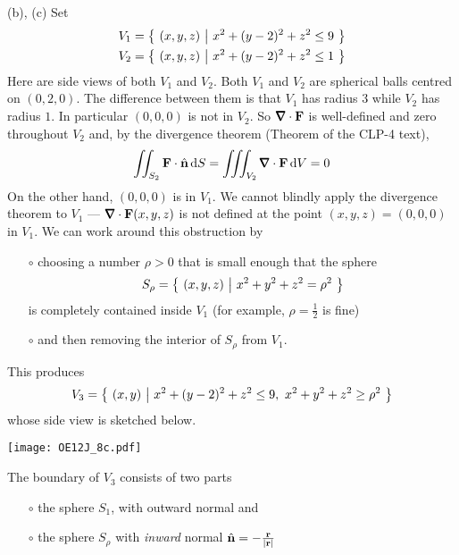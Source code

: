 \begin{solution}
(b), (c) Set
\begin{align*}
V_1 &= \big\{ \ (x,y,z)\ \big|\ x^2 + (y - 2)^2 + z^2 \le 9\ \big\} \\
V_2 &= \big\{ \ (x,y,z)\ \big|\ x^2 + (y - 2)^2 + z^2 \le 1\ \big\} 
\end{align*}
Here are side views of both $V_1$ and $V_2$.
%
Both $V_1$ and $V_2$ are spherical balls centred on $(0,2,0)$.
The difference between them is that $V_1$ has radius $3$ while $V_2$
has radius $1$. In particular $(0,0,0)$ is not in $V_2$. So $\vnabla\cdot\vF$ is 
well-defined and zero throughout $V_2$ and, by the divergence theorem
(Theorem  of the CLP-4 text),
\begin{align*}
\dblInt_{S_2} \vF\cdot\hn\,\dee{S}
=\tripInt_{V_2} \vnabla\cdot\vF\,\dee{V}
=0
\end{align*}
On the other hand, $(0,0,0)$ is in $V_1$. We cannot blindly apply the divergence
theorem to $V_1$ --- $\vnabla\cdot\vF(x,y,z)$ is not defined at the point
$(x,y,z)=(0,0,0)$ in $V_1$. We can work around this obstruction
by 
\begin{itemize}\itemsep1pt \parskip0pt  %
\item[$\circ$]
choosing a number $\rho>0$ that is small enough that the sphere
\begin{equation*}
S_\rho = \big\{ \ (x,y,z)\ \big|\ x^2+y^2+z^2=\rho^2\ \big\}
\end{equation*}
is completely contained inside $V_1$ (for example, $\rho=\frac{1}{2}$ is fine)
\item[$\circ$]
and then removing the interior of $S_\rho$ from $V_1$. 
\end{itemize}
This produces
\begin{equation*}
V_3 = \big\{ \ (x,y)\ \big|\ x^2 + (y - 2)^2 + z^2 \le 9,\ x^2+y^2+z^2\ge\rho^2\ \big\}
\end{equation*}
whose side view is sketched below.
 \begin{center}
    \texttt{[image: OE12J\_8c.pdf]}
\end{center}
The boundary of $V_3$ consists of two parts
\begin{itemize}\itemsep1pt \parskip0pt  %
\item[$\circ$]
the sphere $S_1$, with outward normal and
\item[$\circ$]
the sphere $S_\rho$ with \emph{inward} normal $\hat{\mathbf{n}}=-\frac{\mathbf{r}}{|\mathbf{r}|}$

\end{itemize}
\end{solution}
